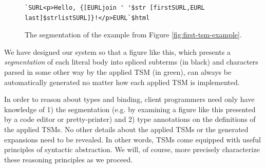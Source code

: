  

\begin{figure}[h]
\begin{lstlisting}[numbers=none]
`SURL<p>Hello, {[EURLjoin ' '$str [firstSURL,EURL last]$strlistSURL]}!</p>EURL`$html
\end{lstlisting}
\caption{The segmentation of the example from Figure \ref{fig:first-tsm-example}.}
\label{fig:first-tsm-example-marked}
\end{figure}

We have designed our system so that a figure like this, which presents a \emph{segmentation} of each literal body into spliced subterms (in black) and characters parsed in some other way by the applied TSM (in green), can always be automatically generated no matter how each applied TSM is implemented. 

In order to reason about types and binding, client programmers need only have knowledge of 1) the segmentation (e.g. by examining a figure like this presented by a code editor or pretty-printer) and 2) type annotations on the definitions of the applied TSMs. No other details about the applied TSMs or the generated expansions need to be revealed. In other words, TSMs come equipped with useful principles of syntactic abstraction. We will, of course, more precisely characterize these reasoning principles as we proceed.





